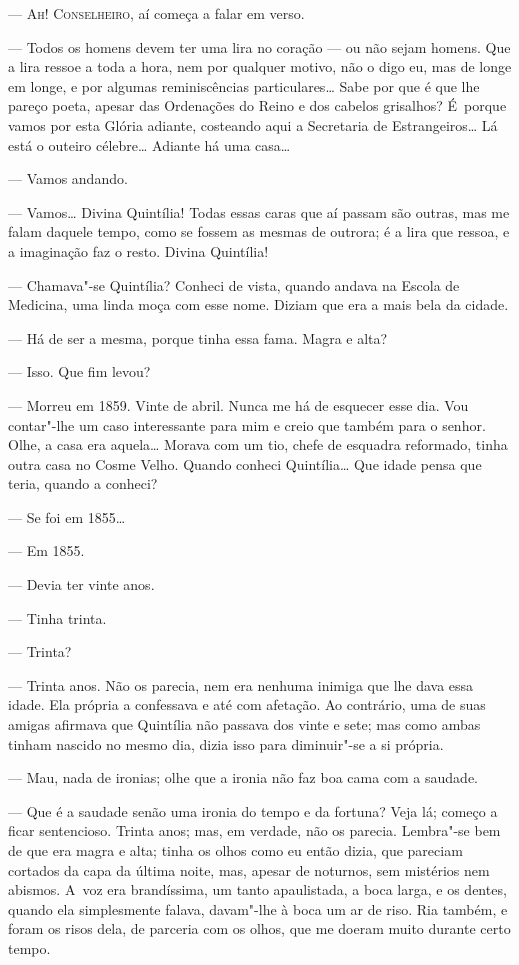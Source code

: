 \begin{linenumbers}

\textsc{--- Ah! Conselheiro,} aí começa a falar em verso.

--- Todos os homens devem ter uma lira no coração --- ou não sejam homens.
Que a lira ressoe a toda a hora, nem por qualquer motivo, não o digo eu,
mas de longe em longe, e por algumas reminiscências particulares\ldots{} Sabe
por que é que lhe pareço poeta, apesar das Ordenações do Reino e dos
cabelos grisalhos? É~porque vamos por esta Glória adiante, costeando
aqui a Secretaria de Estrangeiros\ldots{} Lá está o outeiro célebre\ldots{}
Adiante há uma casa\ldots{}

--- Vamos andando.

--- Vamos\ldots{} Divina Quintília! Todas essas caras que aí passam são
outras, mas me falam daquele tempo, como se fossem as mesmas de outrora;
é a lira que ressoa, e a imaginação faz o resto. Divina Quintília!

--- Chamava"-se Quintília? Conheci de vista, quando andava na Escola de
Medicina, uma linda moça com esse nome. Diziam que era a mais bela da
cidade.

--- Há de ser a mesma, porque tinha essa fama. Magra e alta?

--- Isso. Que fim levou?

--- Morreu em 1859. Vinte de abril. Nunca me há de esquecer esse dia. Vou
contar"-lhe um caso interessante para mim e creio que também para o
senhor. Olhe, a casa era aquela\ldots{} Morava com um tio, chefe de esquadra
reformado, tinha outra casa no Cosme Velho. Quando conheci Quintília\ldots{}
Que idade pensa que teria, quando a conheci?

--- Se foi em 1855\ldots{}

--- Em 1855.

--- Devia ter vinte anos.

--- Tinha trinta.

--- Trinta?

--- Trinta anos. Não os parecia, nem era nenhuma inimiga que lhe dava
essa idade. Ela própria a confessava e até com afetação. Ao contrário,
uma de suas amigas afirmava que Quintília não passava dos vinte e sete;
mas como ambas tinham nascido no mesmo dia, dizia isso para diminuir"-se
a si própria.

--- Mau, nada de ironias; olhe que a ironia não faz boa cama com a
saudade.

--- Que é a saudade senão uma ironia do tempo e da fortuna? Veja lá;
começo a ficar sentencioso. Trinta anos; mas, em verdade, não os
parecia. Lembra"-se bem de que era magra e alta; tinha os olhos como eu
então dizia, que pareciam cortados da capa da última noite, mas, apesar
de noturnos, sem mistérios nem abismos. A~voz era brandíssima, um tanto
apaulistada, a boca larga, e os dentes, quando ela simplesmente falava,
davam"-lhe à boca um ar de riso. Ria também, e foram os risos dela, de
parceria com os olhos, que me doeram muito durante certo tempo.


\end{linenumbers}
